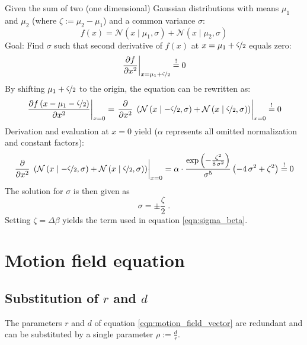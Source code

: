 Given the sum of two (one dimensional) Gaussian distributions with means $\mu_1$ and $\mu_2$ (where $\zeta := \mu_2 - \mu_1$) and a common variance $\sigma$:
  $$f(x) = \mathcal{N}(x \mid \mu_1, \sigma) + \mathcal{N}(x \mid \mu_2, \sigma)$$
Goal: Find $\sigma$ such that second derivative of $f(x)$ at $x = \mu_1 + \nicefrac{\zeta}2$ equals zero:
  $$\left. \frac{\partial f}{\partial x^2} \right|_{x = \mu_1 + \nicefrac{\zeta}2} \overset{!}= 0$$
By shifting $\mu_1 + \nicefrac{\zeta}2$ to the origin, the equation can be rewritten as:
  $$
  \left. \frac{\partial f\left(x - \mu_1 - \nicefrac{\zeta}2\right)}{\partial x^2} \right|_{x = 0} = \left. \frac{\partial}{\partial x^2} \; \left( \mathcal{N}\left(x \mid -\nicefrac{\zeta}2, \sigma\right) + \mathcal{N}\left(x \mid \nicefrac{\zeta}2, \sigma\right) \right) \right|_{x = 0} \overset{!}= 0$$
Derivation and evaluation at $x = 0$ yield ($\alpha$ represents all omitted normalization and constant factors):
  $$\left. \frac{\partial}{\partial x^2} \; \left( \mathcal{N}\left(x \mid -\nicefrac{\zeta}2, \sigma\right) + \mathcal{N}\left(x \mid \nicefrac{\zeta}2, \sigma\right) \right) \right|_{x = 0} = \alpha \cdot \frac{\exp\left(-\frac{\zeta^2}{8 \, \sigma^2}\right)}{\sigma^5} \left( -4\,\sigma^2+\zeta^2 \right) \overset{!}= 0$$
The solution for $\sigma$ is then given as
  $$\sigma = \pm \frac{\zeta}2 \; .$$
Setting $\zeta = \Delta \beta$ yields the term used in equation \ref{eqn:sigma_beta}.

\section{Motion field equation}

\subsection{Substitution of $r$ and $d$}

\label{proof:flow_subst}

The parameters $r$ and $d$ of equation \ref{eqn:motion_field_vector} are redundant and can be substituted by a single parameter $\rho := \frac{d}{r}$.

